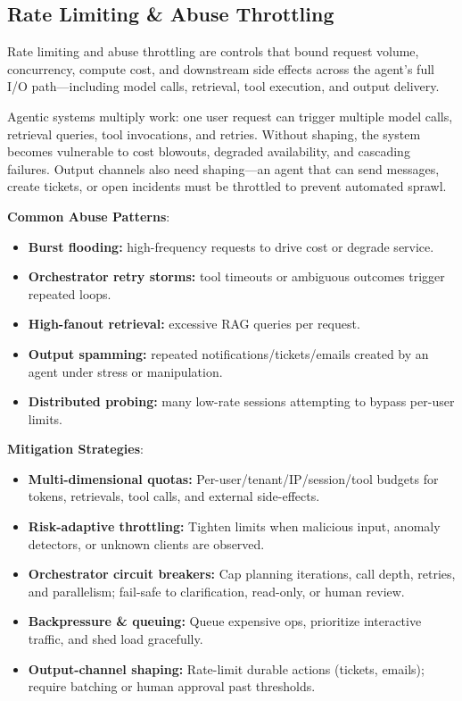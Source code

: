\begin{TNtwocol}
    \section{Rate Limiting & Abuse Throttling}

    Rate limiting and abuse throttling are controls that bound request volume, concurrency, compute cost, and downstream side effects across the agent’s full I/O path—including model calls, retrieval, tool execution, and output delivery.

    Agentic systems multiply work: one user request can trigger multiple model calls, retrieval queries, tool invocations, and retries. Without shaping, the system becomes vulnerable to cost blowouts, degraded availability, and cascading failures. Output channels also need shaping—an agent that can send messages, create tickets, or open incidents must be throttled to prevent automated sprawl.

    \textbf{Common Abuse Patterns}:
    \begin{itemize}
        \item \textbf{Burst flooding:} high-frequency requests to drive cost or degrade service.
        \item \textbf{Orchestrator retry storms:} tool timeouts or ambiguous outcomes trigger repeated loops.
        \item \textbf{High-fanout retrieval:} excessive RAG queries per request.
        \item \textbf{Output spamming:} repeated notifications/tickets/emails created by an agent under stress or manipulation.
        \item \textbf{Distributed probing:} many low-rate sessions attempting to bypass per-user limits.
    \end{itemize}

    \textbf{Mitigation Strategies}:
    \begin{itemize}
        \item \textbf{Multi-dimensional quotas:} Per-user/tenant/IP/session/tool budgets for tokens, retrievals, tool calls, and external side-effects.
        \item \textbf{Risk-adaptive throttling:} Tighten limits when malicious input, anomaly detectors, or unknown clients are observed.
        \item \textbf{Orchestrator circuit breakers:} Cap planning iterations, call depth, retries, and parallelism; fail-safe to clarification, read-only, or human review.
        \item \textbf{Backpressure \& queuing:} Queue expensive ops, prioritize interactive traffic, and shed load gracefully.
        \item \textbf{Output-channel shaping:} Rate-limit durable actions (tickets, emails); require batching or human approval past thresholds.
    \end{itemize}

\end{TNtwocol}
